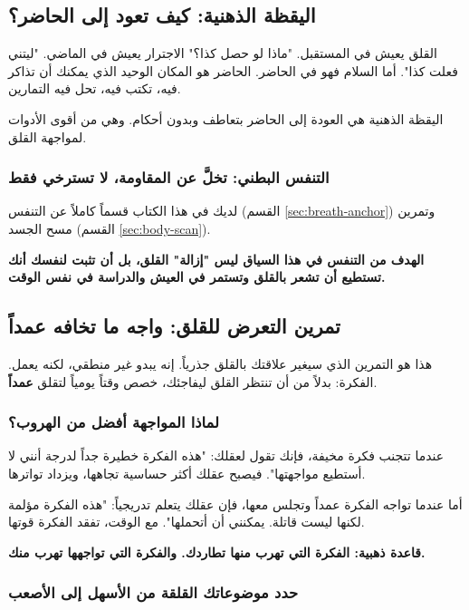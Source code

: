 \documentclass[12pt,a4paper]{book}
\newcommand{\importantAr}[1]{%
	\begin{important}
		\bfseries #1
	\end{important}
}
\begin{document}
	\subsection{اليقظة الذهنية: كيف تعود إلى الحاضر؟}
	\label{sec:mindfulness}
	
	القلق يعيش في المستقبل. "ماذا لو حصل كذا؟" الاجترار يعيش في الماضي. "ليتني فعلت كذا". أما السلام فهو في الحاضر. الحاضر هو المكان الوحيد الذي يمكنك أن تذاكر فيه، تكتب فيه، تحل فيه التمارين.
	
	اليقظة الذهنية هي العودة إلى الحاضر بتعاطف وبدون أحكام. وهي من أقوى الأدوات لمواجهة القلق.
	
	\subsubsection{التنفس البطني: تخلَّ عن المقاومة، لا تسترخي فقط}
	\label{subsec:belly-breathing}
	
	لديك في هذا الكتاب قسماً كاملاً عن التنفس (القسم \ref{sec:breath-anchor}) وتمرين مسح الجسد (القسم \ref{sec:body-scan}).
	
	\importantAr{الهدف من التنفس في هذا السياق ليس "إزالة" القلق، بل أن تثبت لنفسك أنك تستطيع أن تشعر بالقلق وتستمر في العيش والدراسة في نفس الوقت.}

	\subsection{تمرين التعرض للقلق: واجه ما تخافه عمداً}
	\label{sec:worry-exposure}
	
	هذا هو التمرين الذي سيغير علاقتك بالقلق جذرياً. إنه يبدو غير منطقي، لكنه يعمل. الفكرة: بدلاً من أن تنتظر القلق ليفاجئك، خصص وقتاً يومياً لتقلق \textbf{عمداً}.
	
	\subsubsection{لماذا المواجهة أفضل من الهروب؟}
	\label{subsec:why-exposure}
	
	عندما تتجنب فكرة مخيفة، فإنك تقول لعقلك: "هذه الفكرة خطيرة جداً لدرجة أنني لا أستطيع مواجهتها". فيصبح عقلك أكثر حساسية تجاهها، ويزداد تواترها.
	
	أما عندما تواجه الفكرة عمداً وتجلس معها، فإن عقلك يتعلم تدريجياً: "هذه الفكرة مؤلمة لكنها ليست قاتلة. يمكنني أن أتحملها". مع الوقت، تفقد الفكرة قوتها.
	
	\importantAr{قاعدة ذهبية: الفكرة التي تهرب منها تطاردك. والفكرة التي تواجهها تهرب منك.}
	
	\subsubsection{حدد موضوعاتك القلقة من الأسهل إلى الأصعب}
	\label{subsec:worry-hierarchy}
	
\end{document}
